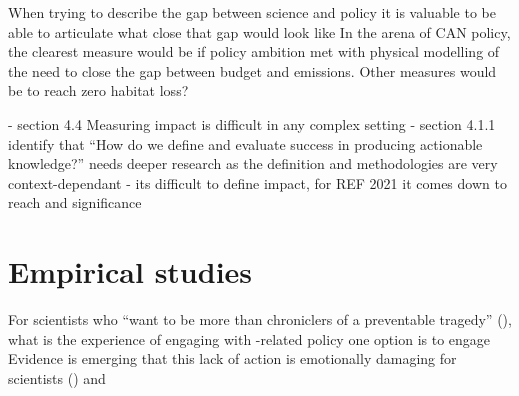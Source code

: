 When trying to describe the gap between science and policy it is valuable to be able to articulate what close that gap would look like
In the arena of CAN policy, the clearest measure would be if policy ambition met with physical modelling of the need to close the gap between budget and emissions. Other measures would be to reach zero habitat loss? 

\cite{BednarekSHG2015} - section 4.4 Measuring impact is difficult in any complex setting 
\cite{JagannathanEtAl2023} - section 4.1.1 identify that ``How do we define and evaluate success in producing actionable knowledge?'' needs deeper research as the definition and methodologies are very context-dependant
\cite{KEU2021impact} - its difficult to define impact, for REF 2021 it comes down to reach and significance

\section{Empirical studies}
For scientists who ``want to be more than chroniclers of a preventable tragedy'' (\cite{WyattGT2024}), what is the experience of engaging with \CAN-related policy one option is to engage 
Evidence is emerging that this lack of action is emotionally damaging for \CAN{} scientists (\cite{Carrington2024}) and 

